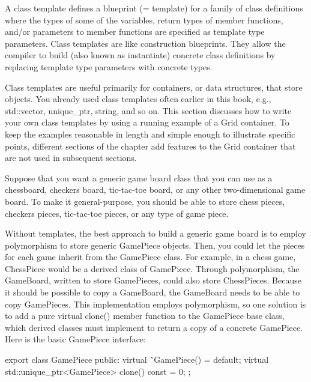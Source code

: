 
A class template defines a blueprint (= template) for a family of class definitions where the types of some of the variables, return types of member functions, and/or parameters to member functions are specified as template type parameters. Class templates are like construction blueprints. They allow the compiler to build (also known as instantiate) concrete class definitions by replacing template type parameters with concrete types.

Class templates are useful primarily for containers, or data structures, that store objects. You already used class templates often earlier in this book, e.g., std::vector, unique\_ptr, string, and so on. This section discusses how to write your own class templates by using a running example of a Grid container. To keep the examples reasonable in length and simple enough to illustrate specific points, different sections of the chapter add features to the Grid container that are not used in subsequent sections.


Suppose that you want a generic game board class that you can use as a chessboard, checkers board, tic-tac-toe board, or any other two-dimensional game board. To make it general-purpose, you should be able to store chess pieces, checkers pieces, tic-tac-toe pieces, or any type of game piece.


Without templates, the best approach to build a generic game board is to employ polymorphism to store generic GamePiece objects. Then, you could let the pieces for each game inherit from the GamePiece class. For example, in a chess game, ChessPiece would be a derived class of GamePiece. Through polymorphism, the GameBoard, written to store GamePieces, could also store ChessPieces. Because it should be possible to copy a GameBoard, the GameBoard needs to be able to copy GamePieces. This implementation employs polymorphism, so one solution is to add a pure virtual clone() member function to the GamePiece base class, which derived classes must implement to return a copy of a concrete GamePiece. Here is the basic GamePiece interface:

\begin{cpp}
export class GamePiece
{
    public:
        virtual ˜GamePiece() = default;
        virtual std::unique_ptr<GamePiece> clone() const = 0;
};
\end{cpp}

